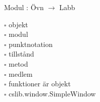 
Modul : Övn  $\rightarrow$ Labb 
\begin{multicols}{3}\SlideFontTiny
$\square$ objekt \\
$\square$ modul \\
$\square$ punktnotation \\
$\square$ tillstånd \\
$\square$ metod \\
$\square$ medlem \\
$\square$ funktioner är objekt \\
$\square$ cslib.window.SimpleWindow \\     
\end{multicols}

